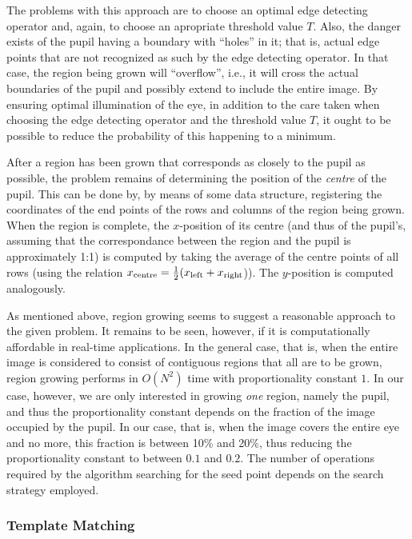 The problems with this approach are to choose an optimal edge
detecting operator and, again, to choose an apropriate threshold
value $T$.  Also, the danger exists of the pupil having a boundary
with ``holes'' in it; that is, actual edge points that are not
recognized as such by the edge detecting operator.  In that case, the
region being grown will ``overflow'', i.e., it will cross the actual
boundaries of the pupil and possibly extend to include the entire
image.  By ensuring optimal illumination of the eye, in addition to
the care taken when choosing the edge detecting operator and the
threshold value $T$, it ought to be possible to reduce the probability
of this happening to a minimum.

After a region has been grown that corresponds as closely to the pupil
as possible, the problem remains of determining the position of the
{\em centre\/} of the pupil.  This can be done by, by means of some
data structure, registering the coordinates of the end points of the
rows and columns of the region being grown.  When the region is
complete, the $x$-position of its centre (and thus of the pupil's,
assuming that the correspondance between the region and the pupil is
approximately 1:1) is computed by taking the average of the centre
points of all rows (using the relation $x_{\mbox{\scriptsize
    centre}}=\frac{1}{2} (x_{\mbox{\scriptsize
    left}}+x_{\mbox{\scriptsize right}}$)).  The $y$-position is
computed analogously.

As mentioned above, region growing seems to suggest a reasonable
approach to the given problem.  It remains to be seen, however, if it
is computationally affordable in real-time applications.  In the
general case, that is, when the entire image is considered to consist
of contiguous regions that all are to be grown, region growing
performs in $O(N^{2})$ time with proportionality constant $1$.  In our
case, however, we are only interested in growing {\em one\/} region,
namely the pupil, and thus the proportionality constant depends on the
fraction of the image occupied by the pupil.  In our case, that is,
when the image covers the entire eye and no more, this fraction is
between 10\% and 20\%, thus reducing the proportionality constant to
between $0.1$ and $0.2$.  The number of operations required by the
algorithm searching for the seed point depends on the search strategy
employed.

\subsubsection{Template Matching}


